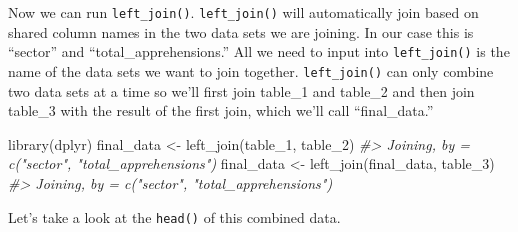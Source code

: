 \documentclass[
]{krantz}
\makeatletter
\newenvironment{Shaded}{\begin{snugshade}}{\end{snugshade}}
\newcommand{\CommentTok}[1]{\textcolor[rgb]{0.37,0.37,0.37}{\textit{#1}}}
\newcommand{\FunctionTok}[1]{\textcolor[rgb]{0,0,0}{#1}}
\newcommand{\NormalTok}[1]{#1}
\newcommand{\OtherTok}[1]{\textcolor[rgb]{0.37,0.37,0.37}{#1}}
\newcommand{\SpecialCharTok}[1]{\textcolor[rgb]{0,0,0}{#1}}
\newcommand{\StringTok}[1]{\textcolor[rgb]{0.5,0.5,0.5}{#1}}
\newenvironment{kframe}{%
\medskip{}
\setlength{\fboxsep}{.8em}
 \def\at@end@of@kframe{}%
 \ifinner\ifhmode%
  \def\at@end@of@kframe{\end{minipage}}%
  \begin{minipage}{\columnwidth}%
 \fi\fi%
 \def\FrameCommand##1{\hskip\@totalleftmargin \hskip-\fboxsep
 \colorbox{shadecolor}{##1}\hskip-\fboxsep
     \hskip-\linewidth \hskip-\@totalleftmargin \hskip\columnwidth}%
 \MakeFramed {\advance\hsize-\width
   \@totalleftmargin\z@ \linewidth\hsize
   \@setminipage}}%
 {\par\unskip\endMakeFramed%
 \at@end@of@kframe}
\renewenvironment{Shaded}{\begin{kframe}}{\end{kframe}}
\makeatother
\begin{document}
\begin{Shaded}
\end{Shaded}

Now we can run \texttt{left\_join()}. \texttt{left\_join()}
will automatically join based on shared column names in the
two data sets we are joining. In our case this is ``sector''
and ``total\_apprehensions.'' All we need to input into
\texttt{left\_join()} is the name of the data sets we want
to join together. \texttt{left\_join()} can only combine two
data sets at a time so we'll first join table\_1 and
table\_2 and then join table\_3 with the result of the first
join, which we'll call ``final\_data.''

\begin{Shaded}
\begin{Highlighting}[]
\FunctionTok{library}\NormalTok{(dplyr)}
\NormalTok{final\_data }\OtherTok{\textless{}{-}} \FunctionTok{left\_join}\NormalTok{(table\_1, table\_2)}
\CommentTok{\#\textgreater{} Joining, by = c("sector", "total\_apprehensions")}
\NormalTok{final\_data }\OtherTok{\textless{}{-}} \FunctionTok{left\_join}\NormalTok{(final\_data, table\_3)}
\CommentTok{\#\textgreater{} Joining, by = c("sector", "total\_apprehensions")}
\end{Highlighting}
\end{Shaded}

Let's take a look at the \texttt{head()} of this combined
data.
\end{document}
